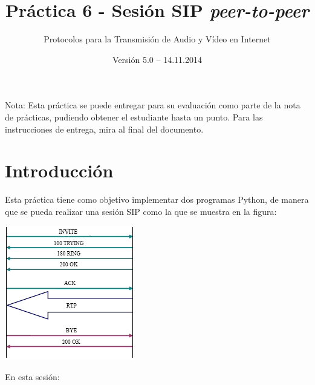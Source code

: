 \documentclass[a4paper,11pt]{article}
\begin{document}
\title{Práctica 6 - Sesión SIP \emph{peer-to-peer}}
\author{Protocolos para la Transmisión de Audio y Vídeo en Internet}
\date{Versión 5.0 – 14.11.2014}



\maketitle
\thispagestyle{empty}



Nota: Esta práctica se puede entregar para su evaluación como parte de la nota de prácticas, pudiendo obtener el estudiante hasta un punto. Para las instrucciones de entrega, mira al final del documento.

\section*{Introducción}

Esta práctica tiene como objetivo implementar dos programas Python,
de manera que se pueda realizar una sesión SIP como la que se
muestra en la figura:

\begin{center}
\includegraphics{figs/sip-invite.png}
\end{center}

En esta sesión:
\end{document}
